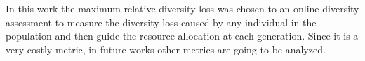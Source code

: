 In this work the maximum relative diversity loss was chosen to an online diversity assessment to measure the diversity loss caused by any individual in the population and then guide the resource allocation at each generation. Since it is a very costly metric, in future works other metrics are going to be analyzed.




